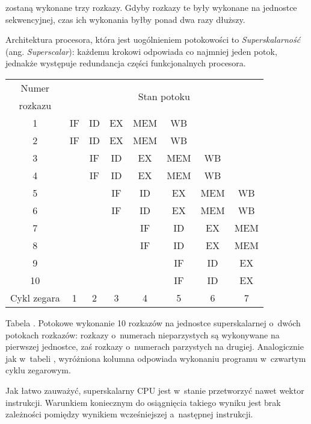 \documentclass[12pt]{mwart}
\newcounter{tabmain}
\newcommand{\mytabcaption}[1]{ \begin{center}\parbox[t]{11.5cm}{\normalsize{Tabela \arabic{tabmain}. #1.}}\end{center} \addtocounter{tabmain}{1} }
\begin{document}
	zostaną wykonane trzy rozkazy. Gdyby rozkazy te były wykonane na jednostce sekwencyjnej, czas ich wykonania byłby ponad dwa razy dłuższy.
\par
%
\indent
	Architektura procesora, która jest uogólnieniem potokowości to \emph{Superskalarność} (ang. \emph{Superscalar}): 
	każdemu krokowi odpowiada co najmniej jeden potok, jednakże występuje redundancja części funkcjonalnych procesora.
	\begin{center}
	\centering
	\begin{tabular}{|c|c|c|c|c|c|c|c|} \hline
	Numer 		 & \multicolumn{7}{c|}{\multirow{2}{*}{Stan potoku}} \\
	rozkazu & \multicolumn{7}{c|}{} \\ \hline
	1 & IF & ID & EX & \cellcolor{yellow} MEM & WB & & \\ \hline
	2 & IF & ID & EX & \cellcolor{yellow} MEM & WB & & \\ \hline
	3 & & IF & ID & \cellcolor{yellow} EX & MEM & WB & \\ \hline
	4 & & IF & ID & \cellcolor{yellow} EX & MEM & WB & \\ \hline
	5 & & & IF & \cellcolor{yellow} ID & EX & MEM & WB \\ \hline
	6 & & & IF & \cellcolor{yellow} ID & EX & MEM & WB \\ \hline
	7 & & & & \cellcolor{yellow} IF & ID & EX & MEM \\ \hline
	8 & & & & \cellcolor{yellow} IF & ID & EX & MEM \\ \hline
	9 & & & & \cellcolor{yellow} & IF & ID & EX \\ \hline
	10 & & & & \cellcolor{yellow} & IF & ID & EX \\ \hline \hline
	Cykl zegara & 1 & 2 & 3 & \cellcolor{yellow} 4 & 5 & 6 & 7 \\ \hline
	\end{tabular}
	\mytabcaption{Potokowe wykonanie 10 rozkazów na jednostce superskalarnej o~dwóch potokach rozkazów: rozkazy o~numerach nieparzystych są wykonywane na 
					pierwszej jednostce, zaś rozkazy o~numerach parzystych na drugiej. Analogicznie jak w~tabeli \arabic{pipeline}, wyróżniona
					kolumna odpowiada wykonaniu programu w~czwartym cyklu zegarowym}
	\end{center}
	Jak łatwo zauważyć, superskalarny CPU jest w~stanie przetworzyć nawet wektor instrukcji. Warunkiem koniecznym do osiągnięcia takiego
	wyniku jest brak zależności pomiędzy wynikiem wcześniejszej a~następnej instrukcji.
\par
\end{document}
